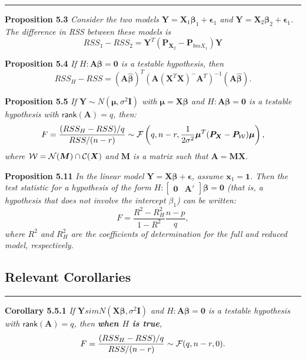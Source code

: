 \documentclass[
]{article}
\newcommand{\bmA}{\ensuremath{\bm A}}
\newcommand{\bmI}{\ensuremath{\bm I}}
\newcommand{\bmM}{\ensuremath{\bm M}}
\newcommand{\bmP}{\ensuremath{\bm P}}
\newcommand{\bmX}{\ensuremath{\bm X}}
\newcommand{\bmx}{\ensuremath{\bm x}}
\newcommand{\bmY}{\ensuremath{\bm Y}}
\newcommand{\bmbeta}{\ensuremath{\bm{\beta}}}
\newcommand{\bmepsilon}{\ensuremath{\bm{\epsilon}}}
\newcommand{\bmmu}{\ensuremath{\bm{\mu}}}
\newcommand{\rank}{\ensuremath{\mathsf{rank}}}
\newcommand{\bbh}{\ensuremath{\hat{\bmbeta}}}
\begin{document}
\begin{center}\rule{0.5\linewidth}{0.5pt}\end{center}

\textbf{Proposition 5.3} \emph{Consider the two models
\(\bmY = \bmX_1\bmbeta_1 + \bmepsilon_1\) and
\(\bmY = \bmX_2\bmbeta_2 + \bmepsilon_1\). The difference in RSS between
these models is} \[
RSS_1 - RSS_2 = \bmY^T(\bmP_{\bmX_2} - \bmP_{bmX_1})\bmY
\]

\textbf{Proposition 5.4} \emph{If \(H: \bmA\bmbeta = \bm0\) is a
testable hypothesis, then}
\[RSS_H - RSS = (\bmA\bbh)^T\left(\bmA(\bmX^T\bmX)^- \bmA^T\right)^{-1}(\bmA\bbh).\]

\textbf{Proposition 5.5} \emph{If \(\bmY \sim N(\bmmu, \sigma^2\bmI)\)
with \(\bmmu = \bmX\bmbeta\) and \(H: \bmA\bmbeta = \bm0\) is a testable
hypothesis with \(\rank(\bmA) = q\), then:}
\[F = \frac{(RSS_H - RSS)/q}{RSS/(n-r)} \sim {\cal F}\left( q, n-r, \frac{1}{2\sigma^2}\bmmu^T(\bmP_{\bmX} - \bmP_{\cal W})\bmmu \right),\]
\emph{where \({\cal W} = {\cal N}(\bmM)\cap {\cal C}(\bmX)\) and
\(\bmM\) is a matrix such that \(\bmA = \bmM\bmX\).}

\textbf{Proposition 5.11} \emph{In the linear model
\(\bmY = \bmX\bmbeta + \bmepsilon\), assume \(\bmx_1 = \bm1\). Then the
test statistic for a hypothesis of the form
\(H: \begin{bmatrix} \bm0 & \bmA' \end{bmatrix} \bmbeta = \bm0\) (that
is, a hypothesis that does not involve the intercept \(\beta_1\)) can be
written:} \[F = \frac{R^2 - R^2_H}{1 - R^2} \frac{n-p}{q},\] \emph{where
\(R^2\) and \(R^2_H\) are the coefficients of determination for the full
and reduced model, respectively.}

\hypertarget{relevant-corollaries}{%
\subsection{Relevant Corollaries}\label{relevant-corollaries}}

\begin{center}\rule{0.5\linewidth}{0.5pt}\end{center}

\textbf{Corollary 5.5.1} \emph{If
\(\bmY sim N(\bmX\bmbeta, \sigma^2\bmI)\) and \(H: \bmA\bmbeta = \bm0\)
is a testable hypothesis with \(\rank(\bmA) = q\), then
\textbf{when $H$ is true},}
\[F = \frac{(RSS_H - RSS)/q}{RSS/(n-r)} \sim {\cal F}(q, n-r, 0).\]
\end{document}
